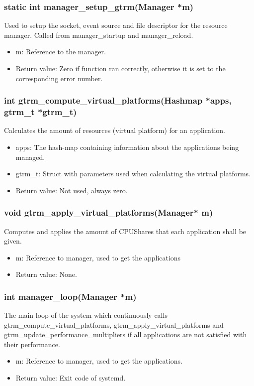 \documentclass[nobiblatex]{LTHthesis}
\begin{document}
\subsubsection{static int manager\_setup\_gtrm(Manager *m)}
Used to setup the socket, event source and file descriptor for the resource manager. Called from manager\_startup and manager\_reload.
\begin{itemize}
\item m: Reference to the manager.
\item Return value: Zero if function ran correctly, otherwise it is set to the corresponding error number.
\end{itemize}

\subsubsection{int gtrm\_compute\_virtual\_platforms(Hashmap *apps, gtrm\_t *gtrm\_t)}
Calculates the amount of resources (virtual platform) for an application.
\begin{itemize}
\item apps: The hash-map containing information about the applications being managed.
\item gtrm\_t: Struct with parameters used when calculating the virtual platforms.
\item Return value: Not used, always zero.
\end{itemize}

\subsubsection{void gtrm\_apply\_virtual\_platforms(Manager* m)}
Computes and applies the amount of CPUShares that each application shall be given.
\begin{itemize}
\item m: Reference to manager, used to get the applications
\item Return value: None.
\end{itemize}

\subsubsection{int manager\_loop(Manager *m)}
The main loop of the system which continuously calls gtrm\_compute\_virtual\_platforms, gtrm\_apply\_virtual\_platforms and gtrm\_update\_performance\_multipliers if all applications are not satisfied with their performance.
\begin{itemize}
\item m: Reference to manager, used to get the applications.
\item Return value: Exit code of systemd.
\end{itemize}
\end{document}

